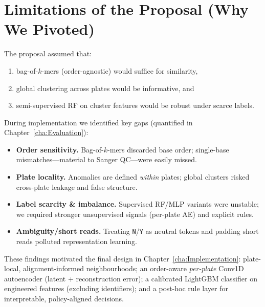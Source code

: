 \section{Limitations of the Proposal (Why We Pivoted)}
\label{sec:proposal_limits}
The proposal assumed that:
\begin{enumerate}
  \item bag-of-$k$-mers (order-agnostic) would suffice for similarity,
  \item global clustering across plates would be informative, and
  \item semi-supervised RF on cluster features would be robust under scarce labels.
\end{enumerate}
During implementation we identified key gaps (quantified in Chapter~\ref{cha:Evaluation}):
\begin{itemize}
  \item \textbf{Order sensitivity.} Bag-of-$k$-mers discarded base order; single-base mismatches—material to Sanger QC—were easily missed.
  \item \textbf{Plate locality.} Anomalies are defined \emph{within} plates; global clusters risked cross-plate leakage and false structure.
  \item \textbf{Label scarcity \& imbalance.} Supervised RF/MLP variants were unstable; we required stronger unsupervised signals (per-plate AE) and explicit rules.
  \item \textbf{Ambiguity/short reads.} Treating \texttt{N}/\texttt{Y} as neutral tokens and padding short reads polluted representation learning.
\end{itemize}
These findings motivated the final design in Chapter~\ref{cha:Implementation}: plate-local, alignment-informed neighbourhoods; an order-aware \emph{per-plate} Conv1D autoencoder (latent + reconstruction error); a calibrated LightGBM classifier on engineered features (excluding identifiers); and a post-hoc rule layer for interpretable, policy-aligned decisions.


